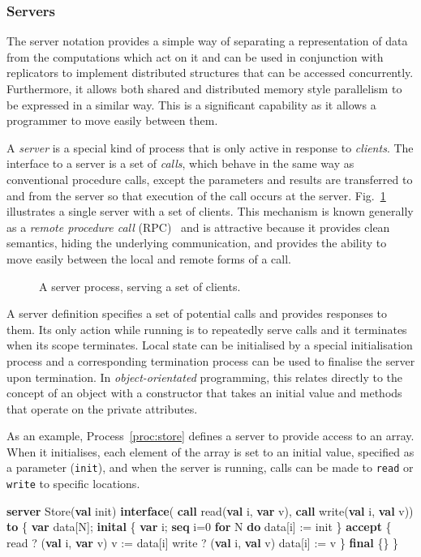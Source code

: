 \documentclass[11pt, conference, compsocconf, onecolumn]{IEEEtran}
\newcommand{\ttt}[1]{\texttt{#1}}
\newcommand{\fig}[1]{Fig.~\ref{fig:#1}}
\newcommand{\proc}[1]{Process~\ref{proc:#1}}
\newcounter{process}
\newenvironment{Process}[1][]{\begin{procfloat}[ht]\vspace{-1.5mm}\refstepcounter{process}{\bf Process~\theprocess} #1}
{\vspace{-3.5mm}\end{procfloat}}
\newcommand{\w}[1]{{\bf #1}}
\newcommand{\inputtikz}[1]{
\begin{center}\end{center}}
\def\codespacing{1.5mm}
\newenvironment{myquote}
{\list{}{\leftmargin=4mm\rightmargin=4mm}\item[]}
{\endlist}
\newenvironment{code*}{\vspace{\codespacing}\begin{myquote}\begin{minipage}{\linewidth}\begin{alltt}}
{\end{alltt}\end{minipage}
\end{myquote}\vspace{\codespacing}
}
\begin{document}
\subsubsection{Servers\label{sec:servers}}

The server notation provides a simple way of separating a representation of
data from the computations which act on it and can be used in conjunction with
replicators to implement distributed structures that can be accessed
concurrently.
Furthermore, it allows both shared and distributed memory style parallelism to
be expressed in a similar way. This is a significant capability as it allows a
programmer to move easily between them. 

A \emph{server} is a special kind of process that is only active in response to
\emph{clients}. The interface to a server is a set of \emph{calls}, which
behave in the same way as conventional procedure calls, except the parameters
and results are transferred to and from the server so that execution of the
call occurs at the server. \fig{server} illustrates a single server with a set
of clients.
This mechanism is known generally as a \emph{remote procedure call}
(RPC)~\cite{Birrell84} and is attractive because it provides clean semantics,
hiding the underlying communication, and provides the ability to move easily
between the local and remote forms of a call.

\begin{figure}[t]
\inputtikz{figures/server}

\caption{A server process, serving a set of clients.}

\label{fig:server}
\end{figure}

A server definition specifies a set of potential calls and provides responses
to them.  Its only action while running is to repeatedly serve calls and it
terminates when its scope terminates.  Local state can be initialised by a
special initialisation process and a corresponding termination process can be
used to finalise the server upon termination.
In \emph{object-orientated} programming, this relates directly to the concept
of an object with a constructor that takes an initial value and methods that
operate on the private attributes.

As an example, \proc{store} defines a server to provide access to an array.
When it initialises, each element of the array is set to an initial value,
specified as a parameter (\ttt{init}), and when the server is running, calls
can be made to \ttt{read} or \ttt{write} to specific locations. 
\begin{Process}
\begin{code*}
\w{server} Store(\w{val} init)
  \w{interface}(
    \w{call} read(\w{val} i, \w{var} v), 
    \w{call} write(\w{val} i, \w{val} v)) \w{to}
\{ \w{var} data[N];
  \w{inital}
  \{ \w{var} i;
    \w{seq} i=0 \w{for} N \w{do}
      data[i] := init
  \}
  \w{accept}
  \{ read ? (\w{val} i, \w{var} v)
      v := data[i]
    write ? (\w{val} i, \w{val} v)
      data[i] := v
  \}
  \w{final} \{\}
\}
\end{code*}
\label{proc:store}
\end{Process}
\end{document}
